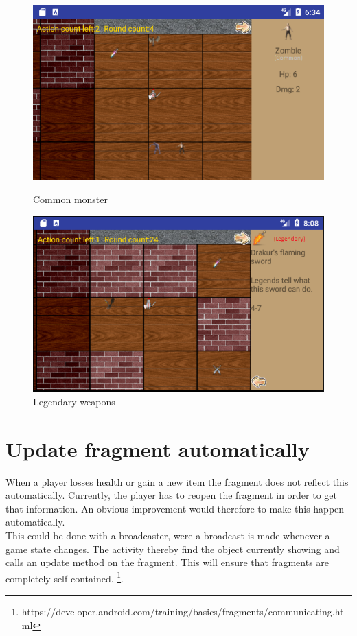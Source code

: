 \begin{figure}[ht!]
	\centering
	\begin{minipage}[b]{0.48\textwidth}
		\includegraphics[width=\textwidth]{images/ClassImprovementCommon.png}
		\caption{Common monster}
		\label{fig:classTypeCommon}
	\end{minipage}
	\hfill
	\begin{minipage}[b]{0.48\textwidth}
		\includegraphics[width=\textwidth]{images/ClassImprovementLegendary.png}
		\caption{Legendary weapons}
		\label{fig:classTypeLegendary}
	\end{minipage}
\end{figure}

\section{Update fragment automatically}
When a player losses health or gain a new item the fragment does not reflect this automatically. Currently, the player has to reopen the fragment in order to get that information. An obvious improvement would therefore to make this happen automatically.\\
This could be done with a broadcaster, were a broadcast is made whenever a game state changes. The activity thereby find the object currently showing and calls an update method on the fragment.
This will ensure that fragments are completely self-contained. \footnote{https://developer.android.com/training/basics/fragments/communicating.html}. %

